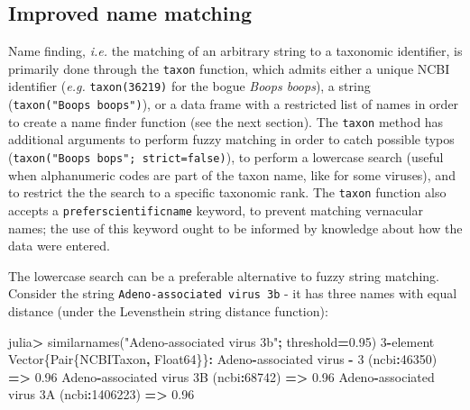 \documentclass[11pt]{article}
\newenvironment{Shaded}{\begin{snugshade}}{\end{snugshade}}
\newcommand{\DataTypeTok}[1]{\textcolor[rgb]{0.13,0.29,0.53}{#1}}
\newcommand{\FloatTok}[1]{\textcolor[rgb]{0.00,0.00,0.81}{#1}}
\newcommand{\StringTok}[1]{\textcolor[rgb]{0.31,0.60,0.02}{#1}}
\newcommand{\OperatorTok}[1]{\textcolor[rgb]{0.81,0.36,0.00}{\textbf{#1}}}
\newcommand{\NormalTok}[1]{#1}
\begin{document}
\hypertarget{improved-name-matching}{%
\subsection{Improved name matching}\label{improved-name-matching}}

Name finding, \emph{i.e.} the matching of an arbitrary string to a
taxonomic identifier, is primarily done through the \texttt{taxon}
function, which admits either a unique NCBI identifier (\emph{e.g.}
\texttt{taxon(36219)} for the bogue \emph{Boops boops}), a string
(\texttt{taxon("Boops\ boops")}), or a data frame with a restricted list
of names in order to create a name finder function (see the next
section). The \texttt{taxon} method has additional arguments to perform
fuzzy matching in order to catch possible typos
(\texttt{taxon("Boops\ bops";\ strict=false)}), to perform a lowercase
search (useful when alphanumeric codes are part of the taxon name, like
for some viruses), and to restrict the the search to a specific
taxonomic rank. The \texttt{taxon} function also accepts a
\texttt{preferscientificname} keyword, to prevent matching vernacular
names; the use of this keyword ought to be informed by knowledge about
how the data were entered.

The lowercase search can be a preferable alternative to fuzzy string
matching. Consider the string \texttt{Adeno-associated\ virus\ 3b} - it
has three names with equal distance (under the Levensthein string
distance function):

\begin{Shaded}
\begin{Highlighting}[]
\NormalTok{julia}\OperatorTok{\textgreater{}}\NormalTok{ similarnames(}\StringTok{"Adeno{-}associated virus 3b"}\OperatorTok{;}\NormalTok{ threshold}\OperatorTok{=}\FloatTok{0.95}\NormalTok{)}
\FloatTok{3}\OperatorTok{{-}}\NormalTok{element }\DataTypeTok{Vector}\NormalTok{\{}\DataTypeTok{Pair}\NormalTok{\{NCBITaxon}\OperatorTok{,} \DataTypeTok{Float64}\NormalTok{\}\}}\OperatorTok{:}
\NormalTok{  Adeno}\OperatorTok{{-}}\NormalTok{associated virus }\OperatorTok{{-}} \FloatTok{3}\NormalTok{ (ncbi}\OperatorTok{:}\FloatTok{46350}\NormalTok{) }\OperatorTok{=\textgreater{}} \FloatTok{0.96}
\NormalTok{   Adeno}\OperatorTok{{-}}\NormalTok{associated virus }\FloatTok{3}\NormalTok{B (ncbi}\OperatorTok{:}\FloatTok{68742}\NormalTok{) }\OperatorTok{=\textgreater{}} \FloatTok{0.96}
\NormalTok{ Adeno}\OperatorTok{{-}}\NormalTok{associated virus }\FloatTok{3}\NormalTok{A (ncbi}\OperatorTok{:}\FloatTok{1406223}\NormalTok{) }\OperatorTok{=\textgreater{}} \FloatTok{0.96}
\end{Highlighting}
\end{Shaded}
\end{document}
